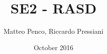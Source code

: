 \documentclass{report}
\title{SE2 - RASD}
\author{Matteo Penco, Riccardo Pressiani}
\date{October 2016}
\begin{document}
\maketitle

\begin{versionhistory}
\end{versionhistory}

\tableofcontents





\listoffigures
\begingroup
\let\clearpage\relax
\listoftables
\endgroup



\end{document}
